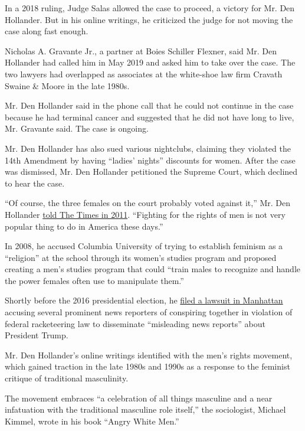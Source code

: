 In a 2018 ruling, Judge Salas allowed the case to proceed, a victory for
Mr. Den Hollander. But in his online writings, he criticized the judge
for not moving the case along fast enough.

Nicholas A. Gravante Jr., a partner at Boies Schiller Flexner, said Mr.
Den Hollander had called him in May 2019 and asked him to take over the
case. The two lawyers had overlapped as associates at the white-shoe law
firm Cravath Swaine \& Moore in the late 1980s.

Mr. Den Hollander said in the phone call that he could not continue in
the case because he had terminal cancer and suggested that he did not
have long to live, Mr. Gravante said. The case is ongoing.

Mr. Den Hollander has also sued various nightclubs, claiming they
violated the 14th Amendment by having ``ladies' nights'' discounts for
women. After the case was dismissed, Mr. Den Hollander petitioned the
Supreme Court, which declined to hear the case.

``Of course, the three females on the court probably voted against it,''
Mr. Den Hollander
\href{https://cityroom.blogs.nytimes3xbfgragh.onion/2011/01/13/one-mans-odd-fight-against-ladies-nights/}{told
The Times in 2011}. ``Fighting for the rights of men is not very popular
thing to do in America these days.''

In 2008, he accused Columbia University of trying to establish feminism
as a ``religion'' at the school through its women's studies program and
proposed creating a men's studies program that could ``train males to
recognize and handle the power females often use to manipulate them.''

Shortly before the 2016 presidential election, he
\href{https://assets.documentcloud.org/documents/3034119/16cv6624-1-Complaint.pdf}{filed
a lawsuit in Manhattan} accusing several prominent news reporters of
conspiring together in violation of federal racketeering law to
disseminate ``misleading news reports'' about President Trump.

Mr. Den Hollander's online writings identified with the men's rights
movement, which gained traction in the late 1980s and 1990s as a
response to the feminist critique of traditional masculinity.

The movement embraces ``a celebration of all things masculine and a near
infatuation with the traditional masculine role itself,'' the
sociologist, Michael Kimmel, wrote in his book ``Angry White Men.''

